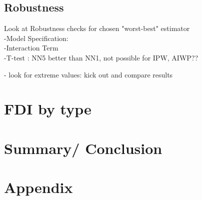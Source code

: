 \documentclass[a4paper,11pt]{scrartcl}
\newcommand{\sectionnumbering}[1]{%
  \setcounter{section}{0}%
   \renewcommand{\thesection}{\csname #1\endcsname{section}}}
\begin{document}
\subsection{Robustness}
Look at Robustness checks for chosen "worst-best" estimator \\
-Model Specification: \\
-Interaction Term\\
-T-test : NN5 better than NN1, not possible for IPW, AIWP??

- look for extreme values: kick out and compare results 






\section{FDI by type}

\section{Summary/ Conclusion}




\newpage






\section*{Appendix}
\sectionnumbering{Roman}
\setcounter{page}{3} %
\end{document}
